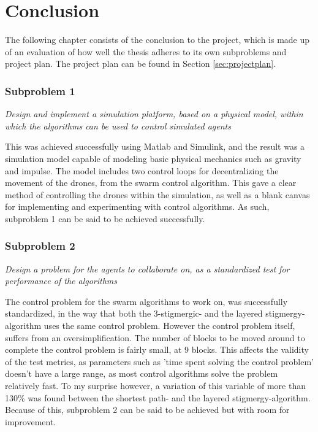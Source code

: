 
\chapter{Conclusion}
\label{chap:conclusion}

The following chapter consists of the conclusion to the project, which is made up of an evaluation of how well the thesis adheres to its own subproblems and project plan. The project plan can be found in Section \ref{sec:projectplan}. 

\subsection{Subproblem 1}
\textit{Design and implement a simulation platform, based on a physical model, within which the algorithms can be used to control simulated agents}

This was achieved successfully using Matlab and Simulink, and the result was a simulation model capable of modeling basic physical mechanics such as gravity and impulse. The model includes two control loops for decentralizing the movement of the drones, from the swarm control algorithm. This gave a clear method of controlling the drones within the simulation, as well as a blank canvas for implementing and experimenting with control algorithms. As such, subproblem 1 can be said to be achieved successfully.

\subsection{Subproblem 2}
\textit{Design a problem for the agents to collaborate on, as a standardized test for performance of the algorithms}

The control problem for the swarm algorithms to work on, was successfully standardized, in the way that both the 3-stigmergic- and the layered stigmergy-algorithm uses the same control problem. However the control problem itself, suffers from an oversimplification. The number of blocks to be moved around to complete the control problem is fairly small, at 9 blocks. This affects the validity of the test metrics, as parameters such as 'time spent solving the control problem' doesn't have a large range, as most control algorithms solve the problem relatively fast. To my surprise however, a variation of this variable of more than 130\% was found between the shortest path- and the layered stigmergy-algorithm. Because of this, subproblem 2 can be said to be achieved but with room for improvement.

